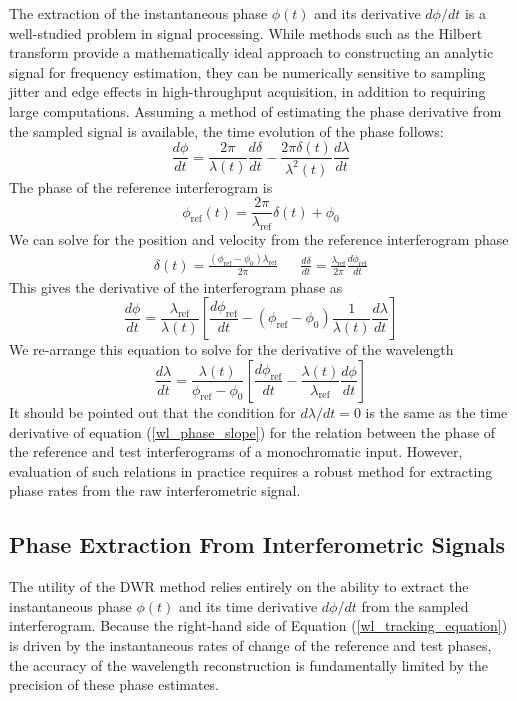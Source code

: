\documentclass[12pt]{report}
\begin{document}
	The extraction of the instantaneous phase $\phi(t)$ and its derivative $d\phi/dt$ is a well-studied problem in signal processing. While methods such as the Hilbert transform provide a mathematically ideal approach to constructing an analytic signal for frequency estimation, they can be numerically sensitive to sampling jitter and edge effects in high-throughput acquisition, in addition to requiring large computations. Assuming a method of estimating the phase derivative from the sampled signal is available, the time evolution of the phase follows:
	\begin{equation}
		\frac{d\phi}{dt} = \frac{2\pi}{\lambda(t)}\frac{d\delta}{dt} - \frac{2\pi \delta(t)}{\lambda^2(t)}\frac{d\lambda}{dt}
	\end{equation}
	The phase of the reference interferogram is
	\begin{equation}
		\phi_\mathrm{ref}(t) = \frac{2\pi}{\lambda_\mathrm{ref}} \delta(t) + \phi_0
	\end{equation}
	We can solve for the position and velocity from the reference interferogram phase
	\begin{align}
		\delta(t) = \frac{\left(\phi_\mathrm{ref}- \phi_0\right) \lambda_\mathrm{ref}}{2\pi} &&
		\frac{d\delta}{dt} = \frac{\lambda_\mathrm{ref}}{2\pi}\frac{d\phi_\mathrm{ref}}{dt}
	\end{align}
	This gives the derivative of the interferogram phase as
	\begin{equation}
		\frac{d\phi}{dt} = \frac{\lambda_\mathrm{ref}}{\lambda(t)}
		\left[
		\frac{d\phi_\mathrm{ref}}{dt} - \left(\phi_\mathrm{ref} - \phi_0\right) \frac{1}{\lambda(t)}\frac{d\lambda}{dt} 
		\right]
	\end{equation}
	We re-arrange this equation to solve for the derivative of the wavelength
	\begin{equation} \label{wl_tracking_equation}
		\frac{d\lambda}{dt} = \frac{\lambda(t)}{\phi_\mathrm{ref} - \phi_0} \left[
		\frac{d\phi_\mathrm{ref}}{dt} - \frac{\lambda(t)}{\lambda_\mathrm{ref}}\frac{d\phi}{dt}
		\right]
	\end{equation}
	It should be pointed out that the condition for $d\lambda / dt = 0$ is the same as the time derivative of equation (\ref{wl_phase_slope}) for the relation between the phase of the reference and test interferograms of a monochromatic input. However, evaluation of such relations in practice requires a robust method for extracting phase rates from the raw interferometric signal.
	
	\subsection{Phase Extraction From Interferometric Signals}
	The utility of the DWR method relies entirely on the ability to extract the instantaneous phase $\phi(t)$ and its time derivative $d\phi/dt$ from the sampled interferogram. Because the right-hand side of Equation (\ref{wl_tracking_equation}) is driven by the instantaneous rates of change of the reference and test phases, the accuracy of the wavelength reconstruction is fundamentally limited by the precision of these phase estimates.
	
\end{document}

